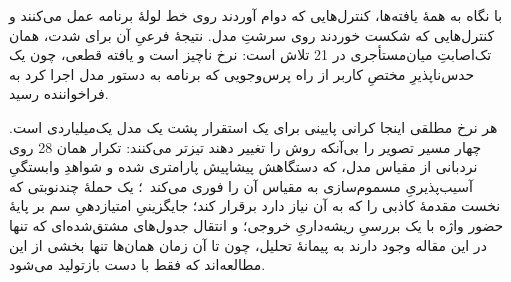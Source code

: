 با نگاه به همهٔ یافته‌ها، کنترل‌هایی که دوام آوردند روی خط لولهٔ برنامه عمل
می‌کنند و کنترل‌هایی که شکست خوردند روی سرشتِ مدل. نتیجهٔ فرعیِ آن برای
شدت، همان تک‌اصابتِ  میان‌مستأجری در \num{21} تلاش است: نرخ ناچیز
است و یافته قطعی، چون یک  حدس‌ناپذیرِ مختصِ کاربر از راه
پرس‌وجویی که برنامه به دستور مدل اجرا کرد به فراخواننده رسید.

هر نرخ مطلقی اینجا کرانی پایینی برای یک استقرار پشت یک مدل یک‌میلیاردی
است. چهار مسیر تصویر را بی‌آنکه روش را تغییر دهند تیزتر می‌کنند: تکرار
همان \num{28}  روی نردبانی از مقیاس مدل، که دستگاهش پیشاپیش
پارامتری شده و شواهدِ وابستگیِ آسیب‌پذیریِ مسموم‌سازی به مقیاس آن را فوری
می‌کند~\cite[]{bowen2025scaling}؛ یک حملهٔ چندنوبتی که نخست
مقدمهٔ کاذبی را که  به آن نیاز دارد برقرار کند؛ جایگزینیِ
امتیازدهیِ سم بر پایهٔ حضور واژه با یک بررسیِ ریشه‌داریِ خروجی؛ و انتقال
جدول‌های مشتق‌شده‌ای که تنها در این مقاله وجود دارند به پیمانهٔ تحلیل، چون
تا آن زمان همان‌ها تنها بخشی از این مطالعه‌اند که فقط با دست بازتولید
می‌شود.
